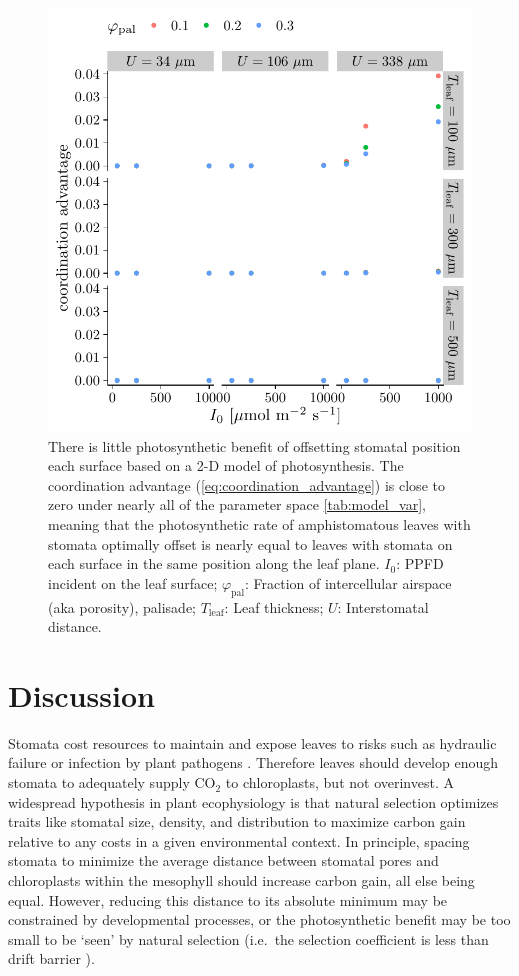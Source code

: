 \documentclass[webpdf,large,modern,unnumsec,namedate]{oup-authoring-template}
\begin{document}
\begin{figure}[ht]
\includegraphics[width = 5in]{figures/model_summary.pdf}
\caption{There is little photosynthetic benefit of offsetting stomatal position each surface based on a 2-D model of photosynthesis. The coordination advantage (\autoref{eq:coordination_advantage}) is close to zero under nearly all of the parameter space \autoref{tab:model_var}, meaning that the photosynthetic rate of amphistomatous leaves with stomata optimally offset is nearly equal to leaves with stomata on each surface in the same position along the leaf plane. $I_0$: PPFD incident on the leaf surface; $\varphi_\text{pal}$: Fraction of intercellular airspace (aka porosity), palisade; $T_\text{leaf}$: Leaf thickness; $U$: Interstomatal distance.}
\label{fig:model_summary}
\end{figure}

\hypertarget{discussion}{%
\section{Discussion}\label{discussion}}

Stomata cost resources to maintain \citep{deans_optimization_2020} and
expose leaves to risks such as hydraulic failure
\citep{wang_theoretical_2020} or infection by plant pathogens
\citep{melotto_stomatal_2017}. Therefore leaves should develop enough
stomata to adequately supply CO\(_2\) to chloroplasts, but not
overinvest. A widespread hypothesis in plant ecophysiology is that
natural selection optimizes traits like stomatal size, density, and
distribution to maximize carbon gain relative to any costs in a given
environmental context. In principle, spacing stomata to minimize the
average distance between stomatal pores and chloroplasts within the
mesophyll should increase carbon gain, all else being equal. However,
reducing this distance to its absolute minimum may be constrained by
developmental processes, or the photosynthetic benefit may be too small
to be `seen' by natural selection (i.e.~the selection coefficient is
less than drift barrier \citep{sung_drift-barrier_2012}).
\end{document}

